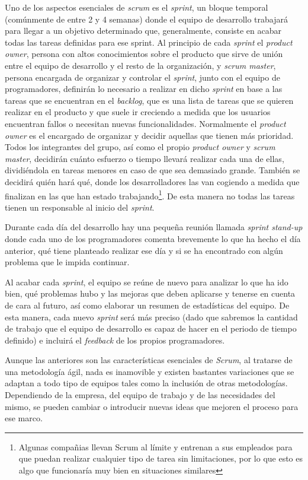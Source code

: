 Uno de los aspectos esenciales de \textit{scrum} es el \textit{sprint}, un bloque temporal (comúnmente de entre 2 y 4 semanas) donde el equipo de desarrollo trabajará para llegar a un objetivo determinado que, generalmente, consiste en acabar todas las tareas definidas para ese sprint.
Al principio de cada \textit{sprint} el \textit{product owner}, persona con altos conocimientos sobre el producto que sirve de unión entre el equipo de desarrollo y el resto de la organización, y \textit{scrum master}, persona encargada de organizar y controlar el \textit{sprint}, junto con el equipo de programadores, definirán lo necesario a realizar en dicho \textit{sprint} en base a las tareas que se encuentran en el \textit{backlog}, que es una lista de tareas que se quieren realizar en el producto y que suele ir creciendo a medida que los usuarios encuentran fallos o necesitan nuevas funcionalidades. Normalmente el \textit{product owner} es el encargado de organizar y decidir aquellas que tienen más prioridad. Todos los integrantes del grupo, así como el propio \textit{product owner} y \textit{scrum master}, decidirán cuánto esfuerzo o tiempo llevará realizar cada una de ellas, dividiéndola en tareas menores en caso de que sea demasiado grande. También se decidirá quién hará qué, donde los desarrolladores las van cogiendo a medida que finalizan en las que han estado trabajando\footnote{Algunas compañias llevan Scrum al límite y entrenan a sus empleados para que puedan realizar cualquier tipo de tarea sin limitaciones, por lo que esto es algo que funcionaría muy bien en situaciones similares}. De esta manera no todas las tareas tienen un responsable al inicio del \textit{sprint}.

Durante cada día del desarrollo hay una pequeña reunión llamada \textit{sprint stand-up} donde cada uno de los programadores comenta brevemente lo que ha hecho el día anterior, qué tiene planteado realizar ese día y si se ha encontrado con algún problema que le impida continuar.

Al acabar cada \textit{sprint}, el equipo se reúne de nuevo para analizar lo que ha ido bien, qué problemas hubo y las mejoras que deben aplicarse y tenerse en cuenta de cara al futuro, así como elaborar un resumen de estadísticas del equipo. De esta manera, cada nuevo \textit{sprint} será más preciso (dado que sabremos la cantidad de trabajo que el equipo de desarrollo es capaz de hacer en el periodo de tiempo definido) e incluirá el \textit{feedback} de los propios programadores.

Aunque las anteriores son las características esenciales de \textit{Scrum}, al tratarse de una metodología ágil, nada es inamovible y existen bastantes variaciones que se adaptan a todo tipo de equipos tales como la inclusión de otras metodologías. Dependiendo de la empresa, del equipo de trabajo y de las necesidades del mismo, se pueden cambiar o introducir nuevas ideas que mejoren el proceso para ese marco.

